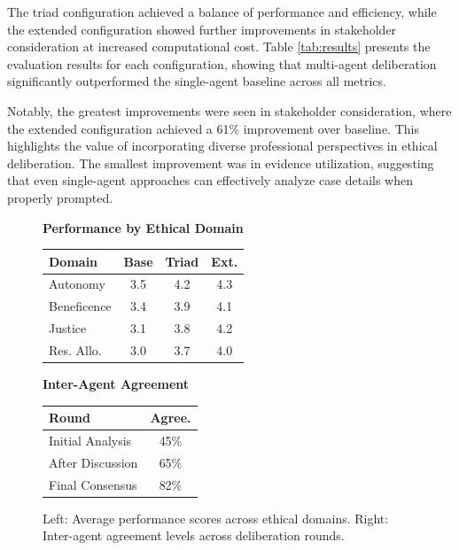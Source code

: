 \documentclass[11pt]{article}
\begin{document}
The triad configuration achieved a balance of performance and efficiency, while the extended configuration showed further improvements in stakeholder consideration at increased computational cost. Table \ref{tab:results} presents the evaluation results for each configuration, showing that multi-agent deliberation significantly outperformed the single-agent baseline across all metrics.

Notably, the greatest improvements were seen in stakeholder consideration, where the extended configuration achieved a 61\% improvement over baseline. This highlights the value of incorporating diverse professional perspectives in ethical deliberation. The smallest improvement was in evidence utilization, suggesting that even single-agent approaches can effectively analyze case details when properly prompted.

\begin{figure}[htbp]
    \centering
    \footnotesize
    \renewcommand{\arraystretch}{1.1}
    \begin{adjustbox}{width=\linewidth,center}
    \begin{minipage}{0.6\linewidth}
        \centering
        \textbf{Performance by Ethical Domain}
        \vspace{0.5ex}
        \setlength{\tabcolsep}{4pt}
        \begin{tabular}{@{}lccc@{}}
        \toprule
        \textbf{Domain} & \textbf{Base} & \textbf{Triad} & \textbf{Ext.} \\
        \midrule
        Autonomy & 3.5 & 4.2 & 4.3 \\
        Beneficence & 3.4 & 3.9 & 4.1 \\
        Justice & 3.1 & 3.8 & 4.2 \\
        Res. Allo. & 3.0 & 3.7 & 4.0 \\
        \bottomrule
        \end{tabular}
    \end{minipage}%
    \begin{minipage}{0.38\linewidth}
        \centering
        \textbf{Inter-Agent Agreement}
        \vspace{0.5ex}
        \setlength{\tabcolsep}{3pt}
        \begin{tabular}{@{}lc@{}}
        \toprule
        \textbf{Round} & \textbf{Agree.} \\
        \midrule
        Initial Analysis & 45\% \\
        After Discussion & 65\% \\
        Final Consensus & 82\% \\
        \bottomrule
        \end{tabular}
    \end{minipage}
    \end{adjustbox}
    \vspace{0.5ex}
    \caption{Left: Average performance scores across ethical domains. Right: Inter-agent agreement levels across deliberation rounds.}
    \label{fig:domain_performance}
    \vspace{1ex}
\end{figure}
\end{document}
